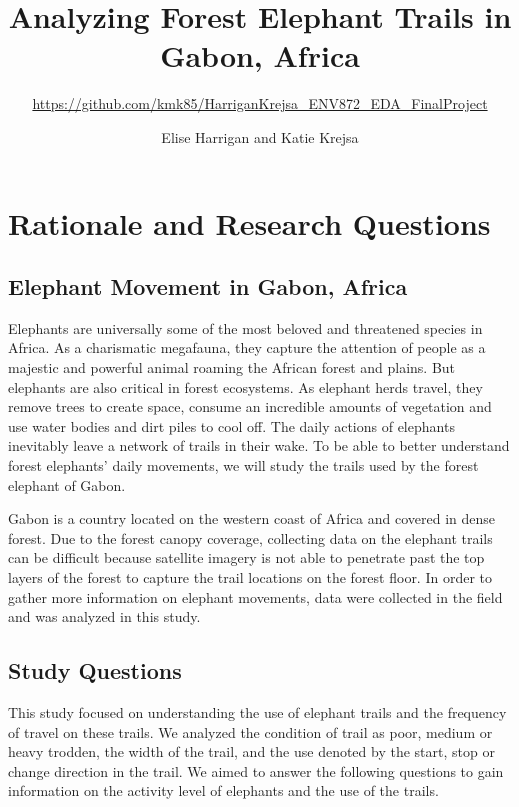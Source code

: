 \documentclass[12pt,]{article}
\title{Analyzing Forest Elephant Trails in Gabon, Africa}
\subtitle{\url{https://github.com/kmk85/HarriganKrejsa_ENV872_EDA_FinalProject}}
\author{Elise Harrigan and Katie Krejsa}
\date{}
\begin{document}
\maketitle

\newpage
\tableofcontents 
\newpage
\listoffigures 
\newpage

\hypertarget{rationale-and-research-questions}{%
\section{Rationale and Research
Questions}\label{rationale-and-research-questions}}

\hypertarget{elephant-movement-in-gabon-africa}{%
\subsection{Elephant Movement in Gabon,
Africa}\label{elephant-movement-in-gabon-africa}}

Elephants are universally some of the most beloved and threatened
species in Africa. As a charismatic megafauna, they capture the
attention of people as a majestic and powerful animal roaming the
African forest and plains. But elephants are also critical in forest
ecosystems. As elephant herds travel, they remove trees to create space,
consume an incredible amounts of vegetation and use water bodies and
dirt piles to cool off. The daily actions of elephants inevitably leave
a network of trails in their wake. To be able to better understand
forest elephants' daily movements, we will study the trails used by the
forest elephant of Gabon.

Gabon is a country located on the western coast of Africa and covered in
dense forest. Due to the forest canopy coverage, collecting data on the
elephant trails can be difficult because satellite imagery is not able
to penetrate past the top layers of the forest to capture the trail
locations on the forest floor. In order to gather more information on
elephant movements, data were collected in the field and was analyzed in
this study.

\hypertarget{study-questions}{%
\subsection{Study Questions}\label{study-questions}}

This study focused on understanding the use of elephant trails and the
frequency of travel on these trails. We analyzed the condition of trail
as poor, medium or heavy trodden, the width of the trail, and the use
denoted by the start, stop or change direction in the trail. We aimed to
answer the following questions to gain information on the activity level
of elephants and the use of the trails.
\end{document}
